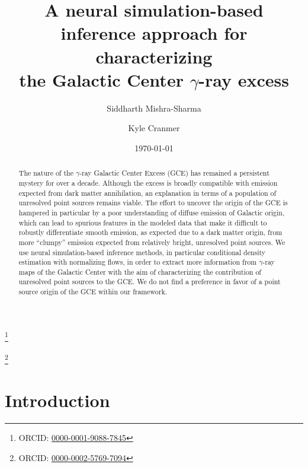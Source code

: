 \documentclass[prd,aps,10pt,nofootinbib,twocolumn,superscriptaddress,preprintnumbers,balancelastpage,longbibliography]{revtex4-1}
\begin{document}
\title{A neural simulation-based inference approach for characterizing \\ the Galactic Center $\gamma$-ray excess}
 
\author{Siddharth Mishra-Sharma}
\thanks{ORCID: \href{https://orcid.org/0000-0001-9088-7845}{0000-0001-9088-7845}}

\author{Kyle Cranmer}
\thanks{ORCID: \href{https://orcid.org/0000-0002-5769-7094}{0000-0002-5769-7094}}

\date{\today}

\begin{abstract}
The nature of the \Fermi $\gamma$-ray Galactic Center Excess (GCE) has remained a persistent mystery for over a decade. Although the excess is broadly compatible with emission expected from dark matter annihilation, an explanation in terms of a population of unresolved point sources remains viable. The effort to uncover the origin of the GCE is hampered in particular by a poor understanding of diffuse emission of Galactic origin, which can lead to spurious features in the modeled data that make it difficult to robustly differentiate smooth emission, as expected due to a dark matter origin, from more ``clumpy'' emission expected from relatively bright, unresolved point sources. We use neural simulation-based inference methods, in particular conditional density estimation with normalizing flows, in order to extract more information from $\gamma$-ray maps of the Galactic Center with the aim of characterizing the contribution of unresolved point sources to the GCE. We do not find a preference in favor of a point source origin of the GCE within our framework.
\end{abstract}

\maketitle

\section{Introduction}
\label{sec:intro}
\end{document}

